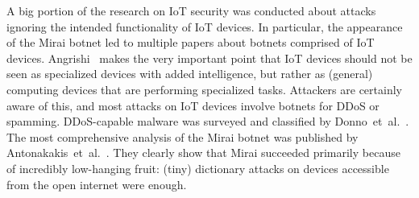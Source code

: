 A big portion of the research on IoT security was conducted about attacks ignoring the intended functionality of IoT devices. In particular, the appearance of the Mirai botnet \cite{Antonakakis:2017:UMB} led to multiple papers about botnets comprised of IoT devices.
Angrishi~\cite{Angrishi:2017:TitiiiviIb} makes the very important point that IoT devices should not be seen as specialized devices with added intelligence, but rather as (general) computing devices that are performing specialized tasks.
Attackers are certainly aware of this, and most attacks on IoT devices involve botnets for DDoS or spamming. DDoS-capable malware was surveyed and classified by Donno~et~al.~\cite{Donno:2017:ADIM}.
The most comprehensive analysis of the Mirai botnet
was published by
Antonakakis~et~al.~\cite{Antonakakis:2017:UMB}. %
They clearly show that Mirai succeeded primarily because of incredibly low-hanging fruit: (tiny) dictionary attacks on devices accessible from the open internet were enough.


